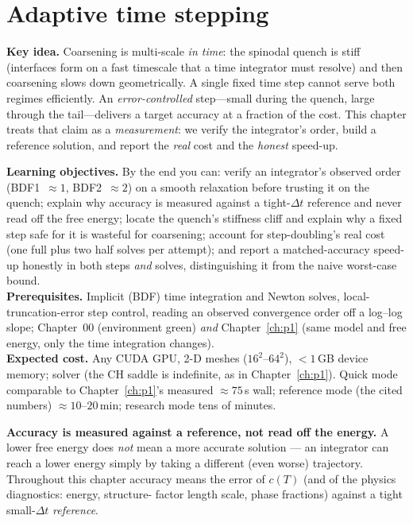 \chapter{Adaptive time stepping}
\label{ch:p2}

\begin{keybox}
\textbf{Key idea.} Coarsening is multi-scale \emph{in time}: the
spinodal quench is stiff (interfaces form on a fast timescale that a
time integrator must resolve) and then coarsening slows down
geometrically. A single fixed time step cannot serve both regimes
efficiently. An \emph{error-controlled} step---small during the quench,
large through the tail---delivers a target accuracy at a fraction of the
cost. This chapter treats that claim as a \emph{measurement}: we verify
the integrator's order, build a reference solution, and report the
\emph{real} cost and the \emph{honest} speed-up.
\end{keybox}

\begin{keybox}
\textbf{Learning objectives.} By the end you can: verify an
integrator's observed order (BDF1~$\approx1$, BDF2~$\approx2$) on a
smooth relaxation before trusting it on the quench; explain why
accuracy is measured against a tight-$\Delta t$ reference and never
read off the free energy; locate the quench's stiffness cliff and
explain why a fixed step safe for it is wasteful for coarsening;
account for step-doubling's real cost (one full plus two half solves
per attempt); and report a matched-accuracy speed-up honestly in both
steps \emph{and} solves, distinguishing it from the naive worst-case
bound.\\[2pt]
\textbf{Prerequisites.} Implicit (BDF) time integration and Newton
solves, local-truncation-error step control, reading an observed
convergence order off a log--log slope; Chapter~00 (environment green)
\emph{and} Chapter~\ref{ch:p1} (same model and free energy, only the
time integration changes).\\[2pt]
\textbf{Expected cost.} Any CUDA GPU, 2-D meshes ($16^2$--$64^2$),
$<1$\,GB device memory; solver  (the CH saddle is
indefinite, as in Chapter~\ref{ch:p1}). Quick mode comparable to
Chapter~\ref{ch:p1}'s measured $\approx75$\,s wall; reference mode
(the cited numbers) $\approx10$--$20$\,min; research mode tens of
minutes.
\end{keybox}

\begin{keybox}
\textbf{Accuracy is measured against a reference, not read off the
energy.} A lower free energy does \emph{not} mean a more accurate
solution --- an integrator can reach a lower energy simply by taking a
different (even worse) trajectory. Throughout this chapter accuracy means
the error of $c(T)$ (and of the physics diagnostics: energy, structure-
factor length scale, phase fractions) against a tight small-$\Delta t$
\emph{reference}.
\end{keybox}

